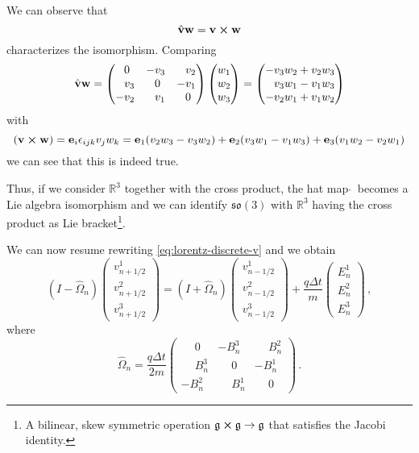 \documentclass[12pt, class=report, crop=false]{standalone}
\begin{document}
We can observe that
\[
\hat{\vb{v}} \vb{w} = \vb{v} \cp \vb{w}
\]
characterizes the isomorphism. Comparing
\[
\hat{\vb{v}} \vb{w} =
\begin{pmatrix}
  \phantom{-}0\phantom{_1} & -v_3           & \phantom{-}v_2 \\
  \phantom{-}v_3 & \phantom{-}0\phantom{_1} &           -v_1 \\
        -v_2     & \phantom{-}v_1 &\phantom{-}0\phantom{_1}
\end{pmatrix}
\begin{pmatrix}
  w_1 \\
  w_2 \\
  w_3
\end{pmatrix}
=
\begin{pmatrix}
            -v_3 w_2 + v_2 w_3 \\
  \phantom{-}v_3 w_1 - v_1 w_3 \\
            -v_2 w_1 + v_1 w_2
\end{pmatrix}
\]
with
\[
(\vb{v} \cp \vb{w}) = \vb{e}_i \epsilon_{ijk} v_j w_k =
\vb{e}_1 (v_2 w_3 - v_3 w_2) + \vb{e}_2 (v_3 w_1 - v_1 w_3) +
\vb{e}_3 (v_1 w_2 - v_2 w_1)
\]
we can see that this is indeed true.

Thus, if we consider \(\mathbb{R}^3\) together with the cross product,
the hat map \(\hat{}\)\ becomes a Lie algebra isomorphism and we
can identify \(\mathfrak{so}(3)\) with \(\mathbb{R}^3\) having the
cross product as Lie bracket\footnote{A bilinear, skew symmetric operation \(\mathfrak{g}\cp\mathfrak{g}\to\mathfrak{g}\) that
satisfies the Jacobi identity.}.

We can now resume rewriting \cref{eq:lorentz-discrete-v} and we obtain
\begin{equation}
\label{eq:lorentz-v-hat-map}
\left(I - \hat{\Omega}_{n}\right)
\begin{pmatrix}
  v_{n+1/2}^1 \\
  v_{n+1/2}^2 \\
  v_{n+1/2}^3
\end{pmatrix}
=
\left(I + \hat{\Omega}_{n}\right)
\begin{pmatrix}
  v_{n-1/2}^1 \\
  v_{n-1/2}^2 \\
  v_{n-1/2}^3
\end{pmatrix}
+ \frac{q \Delta t}{m}
\begin{pmatrix}
  E_n^1 \\
  E_n^2 \\
  E_n^3
\end{pmatrix}\,,
\end{equation}
where
\[
\hat{\Omega}_n =
\frac{q \Delta t}{2m}
\begin{pmatrix}
  \phantom{-}0\phantom{_1} & -B^3_n & \phantom{-}B^2_n \\
  \phantom{-}B^3_n & \phantom{-}0\phantom{_1} & -B^1_n \\
  -B^2_n & \phantom{-}B^1_n & \phantom{-}0\phantom{_1}
\end{pmatrix}\,.
\]
\end{document}

